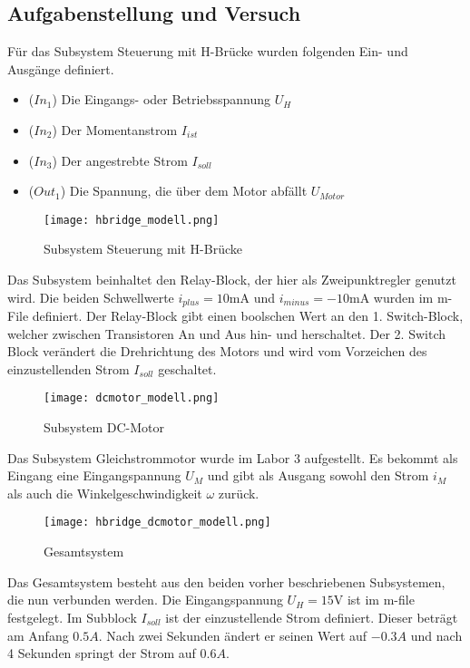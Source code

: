 \subsection{Aufgabenstellung und Versuch}

Für das Subsystem Steuerung mit H-Brücke wurden folgenden Ein- und Ausgänge
definiert.\\

\begin{itemize}
    \item ($In_1$) Die Eingangs- oder Betriebsspannung $U_H$
    \item ($In_2$) Der Momentanstrom $I_{ist}$
    \item ($In_3$) Der angestrebte Strom $I_{soll}$
    \item ($Out_1$) Die Spannung, die über dem Motor abfällt $U_{Motor}$
\end{itemize}


\begin{figure}[H]
    \centering
    \texttt{[image: hbridge\_modell.png]}
    \caption{Subsystem Steuerung mit H-Brücke}
    \label{fig:Subsystem H-Bridge}
\end{figure}

Das Subsystem beinhaltet den Relay-Block, der hier als Zweipunktregler genutzt
wird. Die beiden Schwellwerte $i_{plus}=10\mathrm{mA}$ und $i_{minus}=-10
\mathrm{mA}$ wurden im m-File definiert. Der Relay-Block gibt einen boolschen Wert
an den 1. Switch-Block, welcher zwischen Transistoren An und Aus hin- und
herschaltet. Der 2. Switch Block verändert die Drehrichtung des Motors und
wird vom Vorzeichen des einzustellenden Strom $I_{soll}$ geschaltet.

\begin{figure}[H]
    \centering
    \texttt{[image: dcmotor\_modell.png]}
    \caption{Subsystem DC-Motor}
    \label{fig:Subsystem DC-Motor}
\end{figure}

Das Subsystem Gleichstrommotor wurde im Labor 3 aufgestellt. Es bekommt
als Eingang eine Eingangspannung $U_M$ und gibt als Ausgang sowohl den
Strom $i_M$ als auch die Winkelgeschwindigkeit $\omega$ zurück.

\begin{figure}[H]
    \centering
    \texttt{[image: hbridge\_dcmotor\_modell.png]}
    \caption{Gesamtsystem}
    \label{fig:Gesamtsystem}
\end{figure}

Das Gesamtsystem besteht aus den beiden vorher beschriebenen Subsystemen, die nun
verbunden werden. Die Eingangspannung $U_H=15\mathrm{V}$ ist im m-file festgelegt.
Im Subblock $I_{soll}$ ist der einzustellende Strom definiert. Dieser beträgt
am Anfang $0.5A$. Nach zwei Sekunden ändert er seinen Wert auf $-0.3A$ und nach
4 Sekunden springt der Strom auf $0.6A$.

